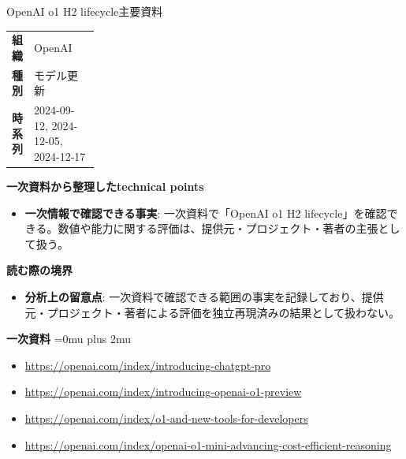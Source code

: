 \begin{technicalnote}{OpenAI o1 H2 lifecycle}{主要資料}
\begingroup
\begin{tabularx}{\linewidth}{@{}>{\bfseries}p{0.22\linewidth}X@{}}
組織 & OpenAI \\
種別 & モデル更新 \\
時系列 & 2024-09-12, 2024-12-05, 2024-12-17 \\
\end{tabularx}
\smallskip
{\bfseries 一次資料から整理したtechnical points}
\begin{itemize}[leftmargin=1.5em,itemsep=0.35em]
\item \textbf{一次情報で確認できる事実}: 一次資料で「OpenAI o1 H2 lifecycle」を確認できる。数値や能力に関する評価は、提供元・プロジェクト・著者の主張として扱う。
\end{itemize}
\begin{minipage}{\linewidth}
{\bfseries 読む際の境界}
\begin{itemize}[leftmargin=1.5em,itemsep=0.35em]
\item \textbf{分析上の留意点}: 一次資料で確認できる範囲の事実を記録しており、提供元・プロジェクト・著者による評価を独立再現済みの結果として扱わない。
\end{itemize}
\begin{samepage}
{\bfseries 一次資料}
\begingroup\sloppy
\Urlmuskip=0mu plus 2mu\relax
\begin{itemize}[leftmargin=1.5em,itemsep=0.25em]
\item {\scriptsize\url{https://openai.com/index/introducing-chatgpt-pro}}
\item {\scriptsize\url{https://openai.com/index/introducing-openai-o1-preview}}
\item {\scriptsize\url{https://openai.com/index/o1-and-new-tools-for-developers}}
\item {\scriptsize\url{https://openai.com/index/openai-o1-mini-advancing-cost-efficient-reasoning}}
\end{itemize}
\endgroup
\end{samepage}
\end{minipage}
\endgroup
\end{technicalnote}
\medskip

